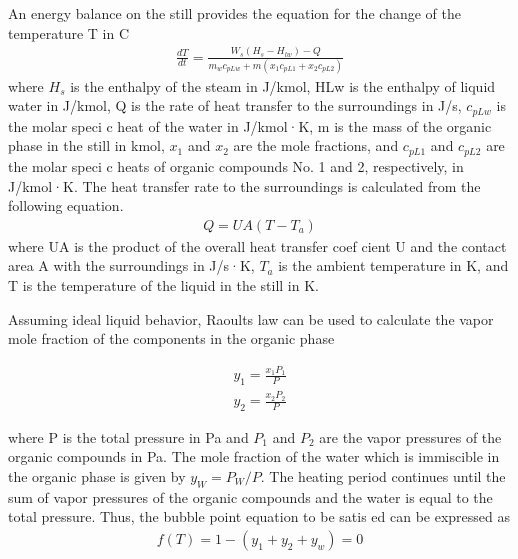 \documentclass[12pt]{report}
\begin{document}
An energy balance on the still provides the equation for the change of the temperature T in \degree C
\begin{gather*}
\frac{dT}{dt} = \frac{W_s(H_s-H_{lw}) - Q}{m_wc_{pLw}+m(x_1c_{pL1}+x_2c_{pL2})}
\end{gather*}
where $H_s$ is the enthalpy of the steam in J/kmol, HLw is the enthalpy of liquid water in J/kmol, Q is the rate of heat transfer to the surroundings in J/s, $c_{pLw}$ is the molar speci c heat of the water in J/kmol·K, m is the mass of the organic phase in the still in kmol, $x_1$ and $x_2$ are the mole fractions, and $c_{pL1}$ and $c_{pL2}$ are the molar speci c heats of organic compounds No. 1 and 2, respectively, in J/kmol·K. The heat transfer rate to the surroundings is calculated from the following equation.
\begin{gather*}
Q = UA(T - T_a)
\end{gather*}
where UA is the product of the overall heat transfer coef cient U and the contact area A with the surroundings in J/s·K, $T_a$ is the ambient temperature in K, and T is the temperature of the liquid in the still in K.

Assuming ideal liquid behavior, Raoults law can be used to calculate the vapor mole fraction of the components in the organic phase

\begin{gather*}
y_1 = \frac{x_1P_1}{P} \\
y_2 = \frac{x_2P_2}{P}
\end{gather*}

where P is the total pressure in Pa and $P_1$ and $P_2$ are the vapor pressures of the organic compounds in Pa. The mole fraction of the water which is immiscible in the organic phase is given by $y_W=P_W/P$. The heating period continues until the sum of vapor pressures of the organic compounds and the water is equal to the total pressure. Thus, the bubble point equation to be satis ed can be expressed as
\begin{gather*}
f(T) = 1 - (y_1+y_2+y_w) = 0
\end{gather*}
\end{document}
